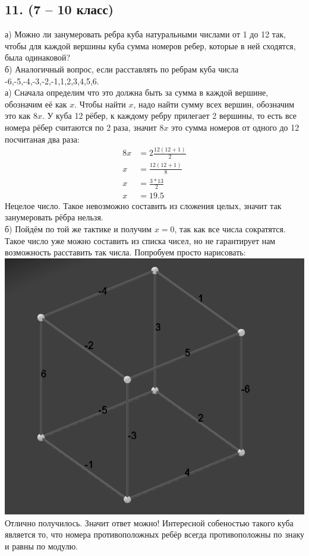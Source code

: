 \documentclass[a4paper,12pt]{article} %
\begin{document}
	\subsection*{11. (7 – 10 класс)}{а) Можно ли занумеровать ребра куба натуральными числами от 1 до 12 так, чтобы для каждой вершины куба сумма номеров ребер, которые в ней сходятся, была одинаковой? \\б) Аналогичный вопрос, если расставлять по ребрам куба числа -6,-5,-4,-3,-2,-1,1,2,3,4,5,6.\\
		
		а) Сначала определим что это должна быть за сумма в каждой вершине, обозначим её как $x$. Чтобы найти $x$, надо найти сумму всех вершин, обозначим это как $8x$. У куба 12 рёбер, к каждому ребру прилегает 2 вершины, то есть все номера рёбер считаются по 2 раза, значит $8x$ это сумма номеров от одного до 12 посчитаная два раза:
		\begin{align*}
			8x &= 2\frac{12(12+1)}{2}\\
			x &= \frac{12(12+1)}{8}\\
			x &= \frac{3*13}{2}\\
			x &= 19.5
		\end{align*}
		Нецелое число. Такое невозможно составить из сложения целых, значит так занумеровать рёбра нельзя.\\
		
		б) Пойдём по той же тактике и получим $x=0$, так как все числа сократятся. Такое число уже можно составить из списка чисел, но не гарантирует нам возможность расставить так числа. Попробуем просто нарисовать:\\
		\includegraphics[scale=0.5]{"Cube Task 11"}\\
		Отлично получилось. Значит ответ можно! Интересной собеностью такого куба является то, что номера противоположных ребёр всегда противоположны по знаку и равны по модулю.
	}
\end{document}
